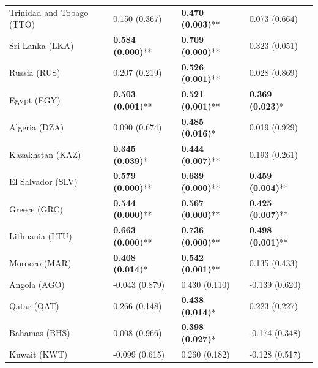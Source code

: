 \begin{longtable}{p{5cm}p{3cm}p{3cm}p{5cm}}
Trinidad and Tobago (TTO) & \textcolor{atlOrange600}{0.150 (0.367)} & \textcolor{atlLime600}{\textbf{0.470 (0.003)}**} & \textcolor{atlOrange600}{0.073 (0.664)} \\
Sri Lanka (LKA) & \textcolor{atlLime600}{\textbf{0.584 (0.000)}**} & \textcolor{atlLime600}{\textbf{0.709 (0.000)}**} & \textcolor{atlOrange600}{0.323 (0.051)} \\
Russia (RUS) & \textcolor{atlOrange600}{0.207 (0.219)} & \textcolor{atlLime600}{\textbf{0.526 (0.001)}**} & \textcolor{atlOrange600}{0.028 (0.869)} \\
Egypt (EGY) & \textcolor{atlLime600}{\textbf{0.503 (0.001)}**} & \textcolor{atlLime600}{\textbf{0.521 (0.001)}**} & \textcolor{atlLime600}{\textbf{0.369 (0.023)}*} \\
Algeria (DZA) & \textcolor{atlOrange600}{0.090 (0.674)} & \textcolor{atlLime600}{\textbf{0.485 (0.016)}*} & \textcolor{atlOrange600}{0.019 (0.929)} \\
Kazakhstan (KAZ) & \textcolor{atlLime600}{\textbf{0.345 (0.039)}*} & \textcolor{atlLime600}{\textbf{0.444 (0.007)}**} & \textcolor{atlOrange600}{0.193 (0.261)} \\
El Salvador (SLV) & \textcolor{atlLime600}{\textbf{0.579 (0.000)}**} & \textcolor{atlLime600}{\textbf{0.639 (0.000)}**} & \textcolor{atlLime600}{\textbf{0.459 (0.004)}**} \\
Greece (GRC) & \textcolor{atlLime600}{\textbf{0.544 (0.000)}**} & \textcolor{atlLime600}{\textbf{0.567 (0.000)}**} & \textcolor{atlLime600}{\textbf{0.425 (0.007)}**} \\
Lithuania (LTU) & \textcolor{atlLime600}{\textbf{0.663 (0.000)}**} & \textcolor{atlLime600}{\textbf{0.736 (0.000)}**} & \textcolor{atlLime600}{\textbf{0.498 (0.001)}**} \\
Morocco (MAR) & \textcolor{atlLime600}{\textbf{0.408 (0.014)}*} & \textcolor{atlLime600}{\textbf{0.542 (0.001)}**} & \textcolor{atlOrange600}{0.135 (0.433)} \\
Angola (AGO) & \textcolor{atlOrange600}{-0.043 (0.879)} & \textcolor{atlOrange600}{0.430 (0.110)} & \textcolor{atlOrange600}{-0.139 (0.620)} \\
Qatar (QAT) & \textcolor{atlOrange600}{0.266 (0.148)} & \textcolor{atlLime600}{\textbf{0.438 (0.014)}*} & \textcolor{atlOrange600}{0.223 (0.227)} \\
Bahamas (BHS) & \textcolor{atlOrange600}{0.008 (0.966)} & \textcolor{atlLime600}{\textbf{0.398 (0.027)}*} & \textcolor{atlOrange600}{-0.174 (0.348)} \\
Kuwait (KWT) & \textcolor{atlOrange600}{-0.099 (0.615)} & \textcolor{atlOrange600}{0.260 (0.182)} & \textcolor{atlOrange600}{-0.128 (0.517)} \\

\end{longtable}
